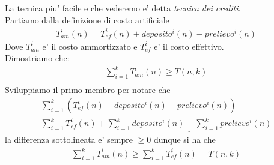 \documentclass{article}
\begin{document}
La tecnica piu' facile e che vederemo e' detta \emph{tecnica dei crediti}. \\
Partiamo dalla definizione di costo artificiale
\begin{align*}
  T^i_{am}(n) = T^i_{ef}(n) + deposito^i(n) - prelievo^i(n)
\end{align*}
Dove $T^i_{am}$ e' il costo ammortizzato e $T^i_{ef}$ e' il costo effettivo. \\
Dimostriamo che:
\begin{align*}
  \sum^k_{i=1} T^i_{am}(n) \geq T(n, k) \\
\end{align*}
Sviluppiamo il primo membro per notare che
\begin{align*}
  \sum^k_{i=1} (T^i_{ef}(n) + deposito^i(n) - prelievo^i(n)) \\
  \sum^k_{i=1} T^i_{ef}(n) + \underline{\sum^k_{i=1} deposito^i(n) - \sum^k_{i=1} prelievo^i(n)}
\end{align*}
la differenza sottolineata e' sempre $\geq 0$ dunque si ha che
\begin{align*}
  \sum^k_{i=1} T^i_{am}(n) \geq \sum^k_{i=1} T^i_{ef}(n) = T(n, k)
\end{align*}
\end{document}
